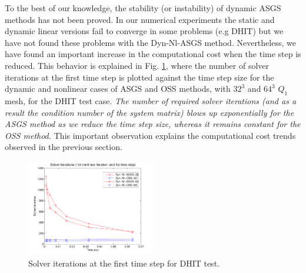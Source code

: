 To the best of our knowledge, the stability (or instability) of dynamic ASGS methods has not been proved. In our numerical experiments the static and dynamic linear versions fail to converge in some problems (e.g DHIT) but we have not found these problems with the Dyn-Nl-ASGS method. Nevertheless, we have found an important increase in the computational cost when the time step is reduced. 
This behavior is explained in Fig. \ref{fig:1st_step_comp_cost}, where the number of solver iterations at the first time step is plotted against the time step size for the dynamic and nonlinear cases of ASGS and OSS methods, with $32^3$ and $64^3$ $Q_1$ mesh, for the DHIT test case. \emph{The number of required solver iterations (and as a result the condition number of the system matrix) blows up exponentially for the ASGS method as we reduce the time step size, whereas it remains constant for the OSS method.} This important observation explains the computational cost trends observed in the previous section.

\begin{figure}[h!]
	\centering	
	\includegraphics[width=0.5\textwidth]{Figures/Chapter4/DHIT/1st_step_comp_cost}
	\caption{Solver iterations at the first time step for DHIT test.}
	\label{fig:1st_step_comp_cost}
\end{figure}


